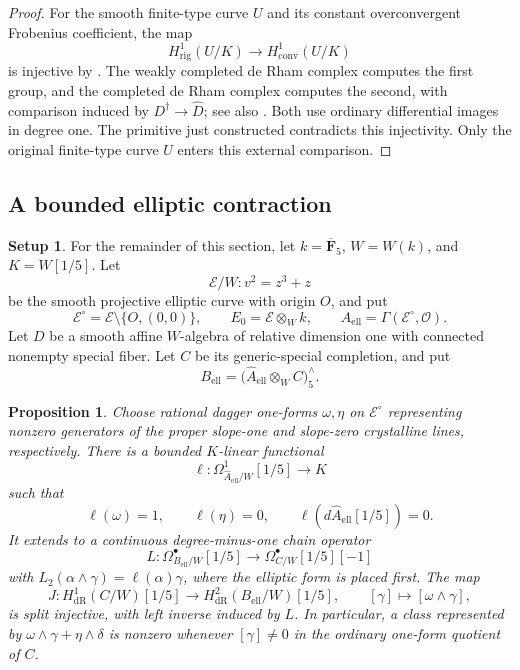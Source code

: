 \documentclass[11pt,a4paper]{amsart}
\numberwithin{equation}{section}
\newtheorem{proposition}[theorem]{Proposition}
\theoremstyle{definition}
\newtheorem{setup}[theorem]{Setup}
\theoremstyle{remark}
\newcommand{\DtwoFF}{\mathbf{F}}
\newcommand{\DtwocO}{\mathcal O}
\newcommand{\DtwocE}{\mathcal E}
\newcommand{\Dtwowh}{\widehat}
\newcommand{\DtwodR}{\mathrm{dR}}
\newcommand{\Dtworig}{\mathrm{rig}}
\newcommand{\Dtwoconv}{\mathrm{conv}}
\begin{document}
\begin{proof}
For the smooth finite-type curve \(U\) and its constant overconvergent
Frobenius coefficient, the map
\[
 H^1_\Dtworig(U/K)\longrightarrow H^1_\Dtwoconv(U/K)
\]
is injective by \cite[Theorem~3.2.1]{CaroDAddezio2025}.
The weakly completed de Rham complex computes the first group, and
the completed de Rham complex computes the second, with comparison
induced by \(D^\dagger\to\Dtwowh D\);
see also \cite[Theorem~2.1.2]{CaroDAddezio2025}.
Both use ordinary differential images in degree one.
The primitive just constructed contradicts this injectivity.
Only the original finite-type curve \(U\) enters this external
comparison.
\end{proof}

\subsection{A bounded elliptic contraction}

\begin{setup}\label{d2:setup:elliptic}
For the remainder of this section, let
\(k=\overline{\DtwoFF}_5\), \(W=W(k)\), and \(K=W[1/5]\).
Let
\[
 \DtwocE/W\colon v^2=z^3+z
\]
be the smooth projective elliptic curve with origin \(O\), and put
\[
 \DtwocE^\circ=\DtwocE\setminus\{O,(0,0)\},
 \qquad
 E_0=\DtwocE\otimes_Wk,
 \qquad
 A_{\mathrm{ell}}=\Gamma(\DtwocE^\circ,\DtwocO).
\]
Let \(D\) be a smooth affine \(W\)-algebra of relative dimension one
with connected nonempty special fiber. Let \(C\) be its
generic-special completion, and put
\[
 B_{\mathrm{ell}}=
 \bigl(\Dtwowh A_{\mathrm{ell}}\otimes_WC\bigr)^\wedge_5.
\]
\end{setup}

\begin{proposition}\label{d2:prop:contraction}
Choose rational dagger one-forms \(\omega,\eta\) on
\(\DtwocE^\circ\) representing nonzero generators of the proper
slope-one and slope-zero crystalline lines, respectively.
There is a bounded \(K\)-linear functional
\[
 \ell\colon\Omega^1_{\Dtwowh A_{\mathrm{ell}}/W}[1/5]\longrightarrow K
\]
such that
\[
 \ell(\omega)=1,\qquad
 \ell(\eta)=0,\qquad
 \ell(d\Dtwowh A_{\mathrm{ell}}[1/5])=0.
\]
It extends to a continuous degree-minus-one chain operator
\[
 L\colon\Omega^\bullet_{B_{\mathrm{ell}}/W}[1/5]
       \longrightarrow\Omega^\bullet_{C/W}[1/5][-1]
\]
with \(L_2(\alpha\wedge\gamma)=\ell(\alpha)\gamma\), where the
elliptic form is placed first.
The map
\[
 J\colon H^1_\DtwodR(C/W)[1/5]\longrightarrow
          H^2_\DtwodR(B_{\mathrm{ell}}/W)[1/5],
 \qquad [\gamma]\longmapsto[\omega\wedge\gamma],
\]
is split injective, with left inverse induced by \(L\).
In particular, a class represented by
\(\omega\wedge\gamma+\eta\wedge\delta\) is nonzero whenever
\([\gamma]\ne0\) in the ordinary one-form quotient of \(C\).
\end{proposition}
\end{document}
